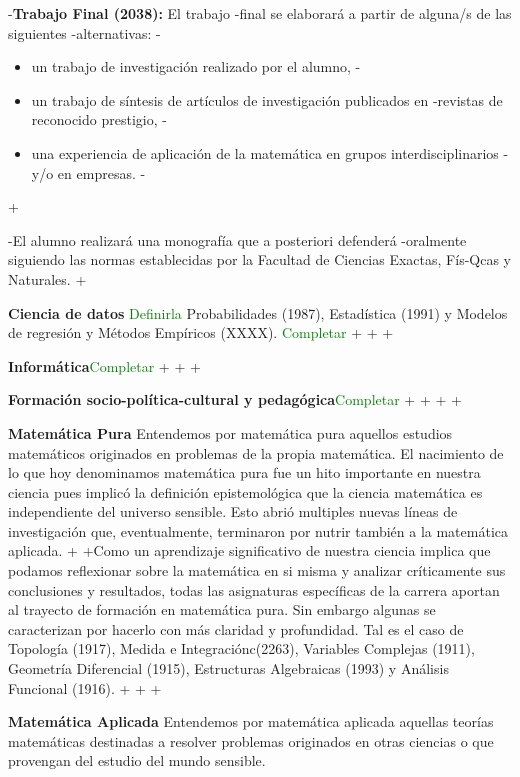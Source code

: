 \begin{description}
{-\textbf{Trabajo Final (2038):} El trabajo
-final se elaborará a partir de alguna/s de las siguientes
-alternativas:
-\begin{itemize}
-\item un trabajo de investigación realizado por el alumno,
-\item un trabajo de síntesis de artículos de investigación publicados en
-revistas de reconocido prestigio,
-\item una experiencia de aplicación de la matemática en grupos interdisciplinarios
-y/o en empresas.
-\end{itemize}
+\begin{description}
 
-El alumno realizará una monografía que a posteriori defenderá
-oralmente siguiendo las normas establecidas por la Facultad de Ciencias Exactas, Fís-Qcas y Naturales.
+\item{\textbf{Ciencia de datos}} \textcolor{green}{Definirla} Probabilidades (1987), Estadística (1991) y Modelos de regresión y Métodos Empíricos (XXXX). \textcolor{green}{Completar}
+
+
+\item{\textbf{Informática}}\textcolor{green}{Completar}
+
+
+\item{\textbf{Formación socio-política-cultural y pedagógica}}\textcolor{green}{Completar}
+
+
+
+\item{\textbf{Matemática Pura}} Entendemos por matemática pura aquellos estudios  matemáticos originados en problemas de la propia matemática. El nacimiento de lo que hoy denominamos  matemática pura fue un hito importante en  nuestra ciencia pues implicó la definición epistemológica que la ciencia matemática es independiente del universo sensible. Esto abrió multiples nuevas líneas de investigación que, eventualmente, terminaron por nutrir también a la matemática aplicada. 
+
+Como un aprendizaje significativo de nuestra ciencia implica que podamos reflexionar sobre la matemática en si  misma y analizar críticamente sus conclusiones y resultados, todas las asignaturas específicas  de la carrera aportan al trayecto de formación en matemática pura. Sin embargo algunas se caracterizan por hacerlo con más claridad y profundidad. Tal es el caso de Topología (1917), Medida e Integraciónc(2263), Variables Complejas (1911), Geometría Diferencial (1915), Estructuras Algebraicas (1993) y Análisis Funcional (1916). 
+
+ 
+\item{\textbf{Matemática Aplicada}} Entendemos por matemática aplicada aquellas teorías matemáticas destinadas a resolver problemas originados en  otras ciencias o que provengan del estudio  del  mundo sensible. 

\end{description}}
\end{description}
